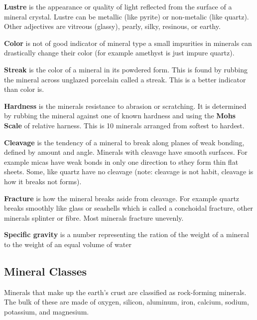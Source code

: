 \documentclass{article}
\begin{document}
\textbf{Lustre} is the appearance or quality of light reflected from the surface of a mineral crystal. Lustre can be metallic  (like pyrite) or non-metalic (like quartz). Other adjectives are vitreous (glassy), pearly, silky, resinous, or earthy.

\textbf{Color} is not of good indicator of mineral type a small impurities in minerals can drastically change their color (for example amethyst is just impure quartz).

\textbf{Streak} is the color of a mineral in its powdered form. This is found by rubbing the mineral across unglazed porcelain called a streak. This is a better indicator than color is.

\textbf{Hardness} is the minerals resistance to abrasion or scratching. It is determined by rubbing the mineral against one of known hardness and using the \textbf{Mohs Scale} of relative harness. This is 10 minerals arranged from softest to hardest.

\textbf{Cleavage} is the tendency of a mineral to break along planes of weak bonding, defined by amount and angle. Minerals with cleavage have smooth surfaces. For example micas have weak bonds in only one direction to sthey form thin flat sheets. Some, like quartz have no cleavage (note: cleavage is not habit, cleavage is how it breaks not forms).

\textbf{Fracture} is how the mineral breaks aside from cleavage. For example quartz breaks smoothly like glass or seashells which is called a conchoidal fracture, other minerals splinter or fibre. Most minerals fracture unevenly.

\textbf{Specific gravity} is a number representing the ration of the weight of a mineral to the weight of an equal volume of water

\subsection*{Mineral Classes} %
\label{sub:mineral_classes}
Minerals that make up the earth's crust are classified as rock-forming minerals. The bulk of these are made of oxygen, silicon, aluminum, iron, calcium, sodium, potassium, and magnesium.
\end{document}
